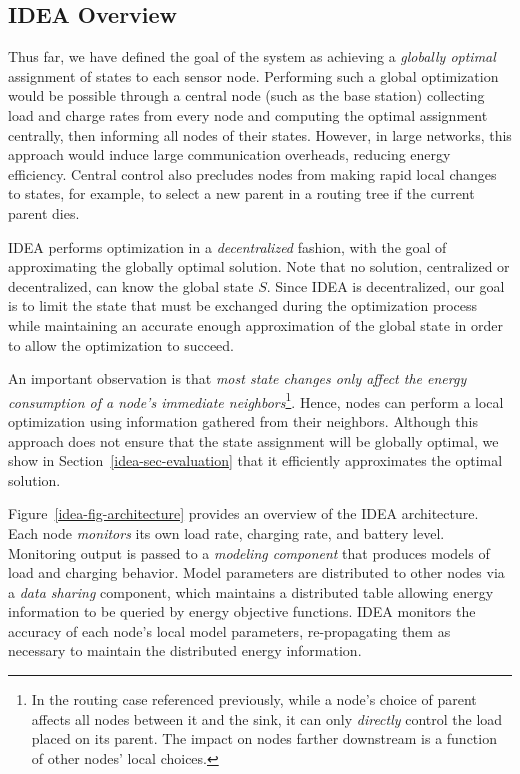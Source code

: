 \subsection{IDEA Overview}

Thus far, we have defined the goal of the system as achieving a
\textit{globally optimal} assignment of states to each sensor node.
Performing such a global optimization would be possible through a central
node (such as the base station) collecting load and charge rates from every
node and computing the optimal assignment centrally, then informing all nodes
of their states. However, in large networks, this approach would induce large
communication overheads, reducing energy efficiency. Central control also
precludes nodes from making rapid local changes to states, for example, to
select a new parent in a routing tree if the current parent dies.

\vfill\eject

IDEA performs optimization in a \textit{decentralized} fashion, with the goal
of approximating the globally optimal solution. Note that no solution,
centralized or decentralized, can know the global state $S$. Since IDEA is
decentralized, our goal is to limit the state that must be exchanged during
the optimization process while maintaining an accurate enough approximation
of the global state in order to allow the optimization to succeed.

An important observation is that \textit{most state changes only affect the
energy consumption of a node's immediate neighbors}\footnote{In the routing
case referenced previously, while a node's choice of parent affects all nodes
between it and the sink, it can only \textit{directly} control the load
placed on its parent. The impact on nodes farther downstream is a function of
other nodes' local choices.}. Hence, nodes can perform a local optimization
using information gathered from their neighbors. Although this approach does
not ensure that the state assignment will be globally optimal, we show in
Section~\ref{idea-sec-evaluation} that it efficiently approximates the
optimal solution.

Figure~\ref{idea-fig-architecture} provides an overview of the IDEA
architecture. Each node \textit{monitors} its own load rate, charging rate,
and battery level. Monitoring output is passed to a \textit{modeling
component} that produces models of load and charging behavior. Model
parameters are distributed to other nodes via a \textit{data sharing}
component, which maintains a distributed table allowing energy information to
be queried by energy objective functions. IDEA monitors the accuracy of each
node's local model parameters, re-propagating them as necessary to maintain
the distributed energy information.

